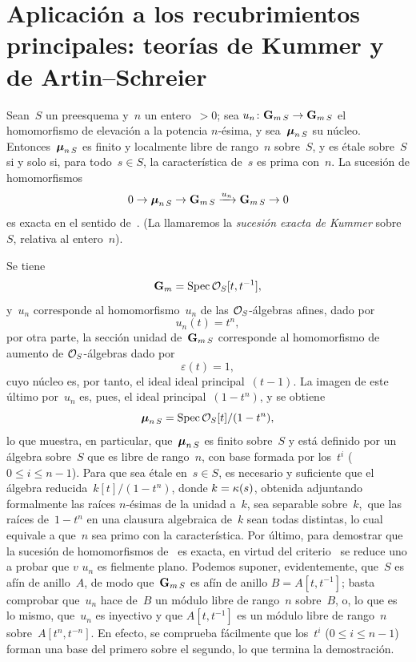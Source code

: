 
\section[Aplicación a los recubrimientos principales]{Aplicación a los
recubrimientos principales: teorías de Kummer y de Artin--Schreier}
\label{XI.6}


\begin{proposition}
\label{XI.6.1}
Sean~$S$ un preesquema y~$n$ un entero~$>0$; sea
$u_n\colon\GG_{m\,S}\to\GG_{m\,S}$ el homomorfismo de elevación a la
potencia $n$-ésima, y sea~$\bbmu_{n\,S}$
\label{indnot:kb}%
su núcleo. Entonces~$\bbmu_{n\,S}$ es finito y localmente libre de rango~$n$
sobre~$S$, y es étale sobre~$S$ si y solo si, para todo~$s\in S$, la
característica de~$s$ es prima con~$n$. La sucesión de homomorfismos
$$
0\to \bbmu_{n\,S}\to\GG_{m\,S}\lto{u_n}\GG_{m\,S}\to 0
$$
es exacta en el sentido de~. (La llamaremos la \emph{sucesión
exacta de Kummer}
%
sobre~$S$, relativa al entero~$n$).
\end{proposition}

Se tiene
$$
\GG_m=\Spec\cal{O}_S[t,t^{-1}],
$$
y~$u_n$ corresponde al homomorfismo~$u_n$ de las
$\cal{O}_S$-álgebras afines, dado por
$$
u_n(t)=t^n,
$$
por otra parte, la sección unidad de~$\GG_{m\,S}$ corresponde al
homomorfismo de aumento de $\cal{O}_S$-álgebras dado por
$$
\varepsilon(t)=1,
$$
cuyo núcleo es, por tanto, el
{ideal}
{ideal}
principal~$(t-1)$. La imagen de este último por~$u_n$ es, pues, el ideal
principal~$(1-t^n)$, y se obtiene
$$
\bbmu_{n\,S}=\Spec\cal{O}_S[t]/(1-t^n),
$$
lo que muestra, en particular, que~$\bbmu_{n\,S}$ es finito sobre~$S$ y está
definido por un álgebra sobre~$S$ que es libre de rango~$n$, con base formada
por los~$t^i$ ($0\leq i\leq n-1$). Para que sea étale en~$s\in S$, es
necesario y suficiente que el álgebra reducida~$k[t]/(1-t^n)$, donde
$k=\kres(s)$, obtenida adjuntando formalmente las raíces $n$-ésimas de la
unidad a~$k$, sea separable sobre~$k$, \,\ie que las raíces de~$1-t^n$ en una
clausura algebraica de~$k$ sean todas distintas, lo cual equivale a que~$n$
sea primo con la característica. Por último, para demostrar que la sucesión
de homomorfismos de~ es exacta, en virtud del
criterio~ se reduce uno a probar que
{$v$}
{$u_n$}
es fielmente plano. Podemos suponer, evidentemente, que~$S$ es afín de
anillo~$A$, de modo que~$\GG_{m\,S}$ es afín de anillo
$B=A[t,t^{-1}]$; basta comprobar que~$u_n$ hace de~$B$ un módulo libre de
rango~$n$ sobre~$B$, o, lo que es lo mismo, que~$u_n$ es inyectivo y que
$A[t,t^{-1}]$ es un módulo libre de rango~$n$ sobre~$A[t^n,t^{-n}]$. En
efecto, se comprueba fácilmente que los~$t^i$ ($0\leq i\leq n-1$) forman
una base del primero sobre el segundo, lo que termina la demostración.

